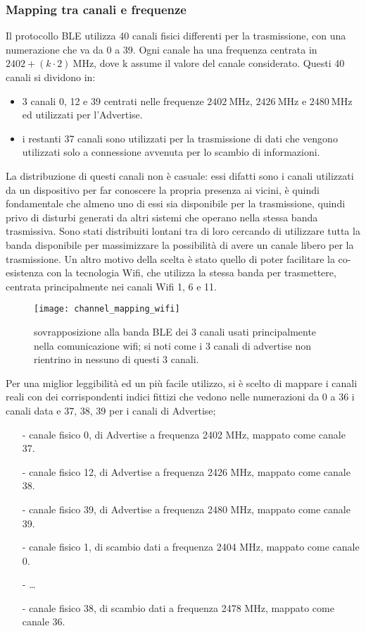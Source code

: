 \subsubsection{Mapping tra canali e frequenze}\label{channels}
Il protocollo BLE utilizza 40 canali fisici differenti per la trasmissione, con una numerazione che va da 0 a 39. Ogni canale ha una frequenza centrata in ${2402 + (k \cdot 2)\ \si{\mega\hertz}}$, dove k assume il valore del canale considerato.
Questi 40 canali si dividono in:
\begin{itemize}
\item 3 canali 0, 12 e 39 centrati nelle frequenze ${2402\ \si{\mega\hertz}}$, ${2426\ \si{\mega\hertz}}$ e ${2480\ \si{\mega\hertz}}$ ed utilizzati per l'Advertise.
\item i restanti 37 canali sono utilizzati per la trasmissione di dati che vengono utilizzati solo a connessione avvenuta per lo scambio di informazioni.
\end{itemize} 
La distribuzione di questi canali non è casuale: essi difatti sono i canali utilizzati da un dispositivo per far conoscere la propria presenza ai vicini, è quindi fondamentale che almeno uno di essi sia disponibile per la trasmissione, quindi privo di disturbi generati da altri sistemi che operano nella stessa banda trasmissiva. Sono stati distribuiti lontani tra di loro cercando di utilizzare tutta la banda disponibile per massimizzare la possibilità di avere un canale libero per la trasmissione. Un altro motivo della scelta è stato quello di poter facilitare la co-esistenza con la tecnologia Wifi, che utilizza la stessa banda per trasmettere, centrata principalmente nei canali Wifi 1, 6 e 11.


\begin{figure}[H]
\texttt{[image: channel\_mapping\_wifi]}
\centering
\caption{sovrapposizione alla banda BLE dei 3 canali usati principalmente nella comunicazione wifi; si noti come i 3 canali di advertise non rientrino in nessuno di questi 3 canali.}
\end{figure}




Per una miglior leggibilità ed un più facile utilizzo, si è scelto di mappare i canali reali con dei corrispondenti indici fittizi che vedono nelle numerazioni da 0 a 36 i canali data e 37, 38, 39 per i canali di Advertise;
\begin{itemize}
\item[-] canale fisico 0, di Advertise a frequenza 2402 MHz, mappato come canale 37.
\item[-] canale fisico 12, di Advertise a frequenza 2426 MHz, mappato come canale 38.
\item[-] canale fisico 39, di Advertise a frequenza 2480 MHz, mappato come canale 39. 
\item[-] canale fisico 1, di scambio dati a frequenza 2404 MHz, mappato come canale 0.
\item[-] \dots
\item[-] canale fisico 38, di scambio dati a frequenza 2478 MHz, mappato come canale 36.
\end{itemize}

